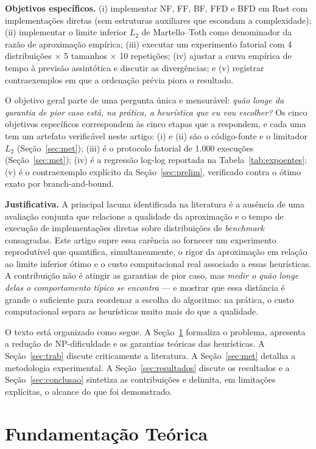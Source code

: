 \documentclass[12pt]{article}
\begin{document}
\textbf{Objetivos específicos.} (i) implementar NF, FF, BF, FFD e BFD em Rust com implementações diretas (sem estruturas auxiliares que escondam a complexidade); (ii) implementar o limite inferior $L_2$ de Martello--Toth \cite{martello1990} como denominador da razão de aproximação empírica; (iii) executar um experimento fatorial com 4 distribuições $\times$ 5 tamanhos $\times$ 10 repetições; (iv) ajustar a curva empírica de tempo à previsão assintótica e discutir as divergências; e (v) registrar contraexemplos em que a ordenação prévia piora o resultado.

O objetivo geral parte de uma pergunta única e mensurável: \emph{quão longe da garantia de pior caso está, na prática, a heurística que eu vou escolher?} Os cinco objetivos específicos correspondem às cinco etapas que a respondem, e cada uma tem um artefato verificável neste artigo: (i) e (ii) são o código-fonte e o limitador $L_2$ (Seção~\ref{sec:met}); (iii) é o protocolo fatorial de 1.000 execuções (Seção~\ref{sec:met}); (iv) é a regressão log-log reportada na Tabela~\ref{tab:expoentes}; (v) é o contraexemplo explícito da Seção~\ref{sec:prelim}, verificado contra o ótimo exato por branch-and-bound.

\textbf{Justificativa.} A principal lacuna identificada na literatura é a ausência de uma avaliação conjunta que relacione a qualidade da aproximação e o tempo de execução de implementações diretas sobre distribuições de \textit{benchmark} consagradas. Este artigo supre essa carência ao fornecer um experimento reprodutível que quantifica, simultaneamente, o rigor da aproximação em relação ao limite inferior ótimo e o custo computacional real associado a essas heurísticas. A contribuição não é atingir as garantias de pior caso, mas \emph{medir o quão longe delas o comportamento típico se encontra} --- e mostrar que essa distância é grande o suficiente para reordenar a escolha do algoritmo: na prática, o custo computacional separa as heurísticas muito mais do que a qualidade.

O texto está organizado como segue. A Seção~\ref{sec:fund} formaliza o problema, apresenta a redução de NP-dificuldade e as garantias teóricas das heurísticas. A Seção~\ref{sec:trab} discute criticamente a literatura. A Seção~\ref{sec:met} detalha a metodologia experimental. A Seção~\ref{sec:resultados} discute os resultados e a Seção~\ref{sec:conclusao} sintetiza as contribuições e delimita, em limitações explícitas, o alcance do que foi demonstrado.

\section{Fundamentação Teórica} \label{sec:fund}
\end{document}
